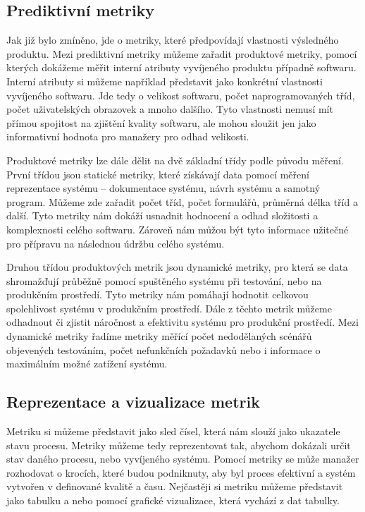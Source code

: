 \documentclass[czech,master,public,dept460,male,cpdeclaration,oneside]{diploma}
\begin{document}
\subsection{Prediktivní metriky}
Jak již bylo zmíněno, jde o metriky, které předpovídají vlastnosti výsledného produktu. Mezi prediktivní metriky můžeme zařadit produktové metriky, pomocí kterých dokážeme měřit interní atributy vyvíjeného produktu případně softwaru. Interní atributy si můžeme například představit jako konkrétní vlastnosti vyvíjeného softwaru. Jde tedy o velikost softwaru, počet naprogramovaných tříd, počet uživatelských obrazovek a mnoho dalšího. Tyto vlastnosti nemusí mít přímou spojitost na zjištění kvality softwaru, ale mohou sloužit jen jako informativní hodnota pro manažery pro odhad velikosti.

Produktové metriky lze dále dělit na dvě základní třídy podle původu měření. První třídou jsou statické metriky, které získávají data pomocí měření reprezentace systému -- dokumentace systému, návrh systému a samotný program. Můžeme zde zařadit počet tříd, počet formulářů, průměrná délka tříd a další. Tyto metriky nám dokáží usnadnit hodnocení a odhad složitosti a komplexnosti celého softwaru. Zároveň nám můžou být tyto informace užitečné pro přípravu na následnou údržbu celého systému.

Druhou třídou produktových metrik jsou dynamické metriky, pro která se data shromažďují průběžně pomocí spuštěného systému při testování, nebo na produkčním prostředí. Tyto metriky nám pomáhají hodnotit celkovou spolehlivost systému v produkčním prostředí. Dále z těchto metrik můžeme odhadnout či zjistit náročnost a efektivitu systému pro produkční prostředí. Mezi dynamické metriky řadíme metriky měřící počet nedodělaných scénářů objevených testováním, počet nefunkčních požadavků nebo i informace o maximálním možné zatížení systému.

\subsection{Reprezentace a vizualizace metrik}
Metriku si můžeme představit jako sled čísel, která nám slouží jako ukazatele stavu procesu. Metriky můžeme tedy reprezentovat tak, abychom dokázali určit stav daného procesu, nebo vyvíjeného systému. Pomocí metriky se může manažer rozhodovat o krocích, které budou podniknuty, aby byl proces efektivní a systém vytvořen v definované kvalitě a času. Nejčastěji si metriku můžeme představit jako tabulku a nebo pomocí grafické vizualizace, která vychází z dat tabulky.
\end{document}
